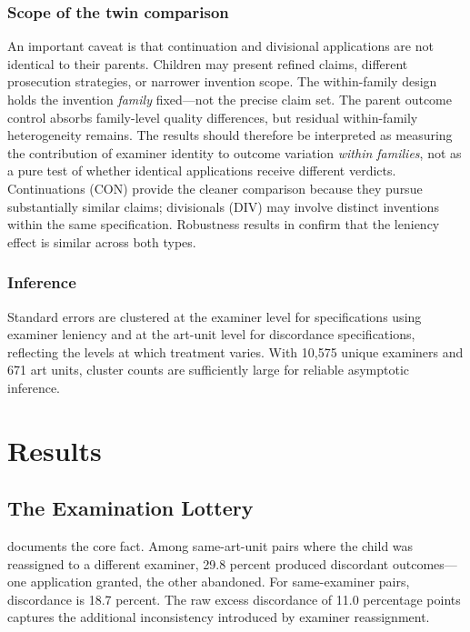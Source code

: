 \documentclass[12pt]{article}
\begin{document}
\subsubsection*{Scope of the twin comparison} An important caveat is that continuation and divisional applications are not identical to their parents. Children may present refined claims, different prosecution strategies, or narrower invention scope. The within-family design holds the invention \textit{family} fixed---not the precise claim set. The parent outcome control absorbs family-level quality differences, but residual within-family heterogeneity remains. The results should therefore be interpreted as measuring the contribution of examiner identity to outcome variation \textit{within families}, not as a pure test of whether identical applications receive different verdicts. Continuations (CON) provide the cleaner comparison because they pursue substantially similar claims; divisionals (DIV) may involve distinct inventions within the same specification. Robustness results in  confirm that the leniency effect is similar across both types.

\subsubsection*{Inference} Standard errors are clustered at the examiner level for specifications using examiner leniency and at the art-unit level for discordance specifications, reflecting the levels at which treatment varies. With 10,575 unique examiners and 671 art units, cluster counts are sufficiently large for reliable asymptotic inference.


\section{Results}
\label{sec:results}

\subsection{The Examination Lottery}

 documents the core fact. Among same-art-unit pairs where the child was reassigned to a different examiner, 29.8 percent produced discordant outcomes---one application granted, the other abandoned. For same-examiner pairs, discordance is 18.7 percent. The raw excess discordance of 11.0 percentage points captures the additional inconsistency introduced by examiner reassignment.
\end{document}
